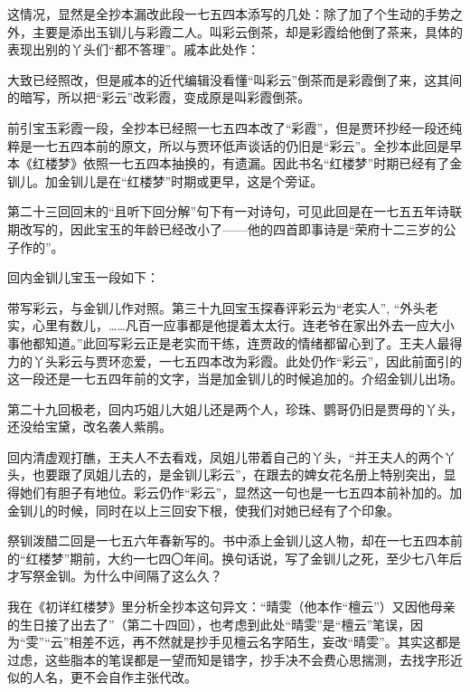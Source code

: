 \par 这情况，显然是全抄本漏改此段一七五四本添写的几处：除了加了个生动的手势之外，主要是添出玉钏儿与彩霞二人。叫彩云倒茶，却是彩霞给他倒了茶来，具体的表现出别的丫头们“都不答理”。戚本此处作：
\par 大致已经照改，但是戚本的近代编辑没看懂“叫彩云”倒茶而是彩霞倒了来，这其间的暗写，所以把“彩云”改彩霞，变成原是叫彩霞倒茶。
\par 前引宝玉彩霞一段，全抄本已经照一七五四本改了“彩霞”，但是贾环抄经一段还纯粹是一七五四本前的原文，所以与贾环低声谈话的仍旧是“彩云”。全抄本此回是早本《红楼梦》依照一七五四本抽换的，有遗漏。因此书名“红楼梦”时期已经有了金钏儿。加金钏儿是在“红楼梦”时期或更早，这是个旁证。
\par 第二十三回回末的“且听下回分解”句下有一对诗句，可见此回是在一七五五年诗联期改写的，因此宝玉的年龄已经改小了——他的四首即事诗是“荣府十二三岁的公子作的”。
\par 回内金钏儿宝玉一段如下：
\par 带写彩云，与金钏儿作对照。第三十九回宝玉探春评彩云为“老实人”, “外头老实，心里有数儿，……凡百一应事都是他提着太太行。连老爷在家出外去一应大小事他都知道。”此回写彩云正是老实而干练，连贾政的情绪都留心到了。王夫人最得力的丫头彩云与贾环恋爱，一七五四本改为彩霞。此处仍作“彩云”，因此前面引的这一段还是一七五四年前的文字，当是加金钏儿的时候追加的。介绍金钏儿出场。
\par 第二十九回极老，回内巧姐儿大姐儿还是两个人，珍珠、鹦哥仍旧是贾母的丫头，还没给宝黛，改名袭人紫鹃。
\par 回内清虚观打醮，王夫人不去看戏，凤姐儿带着自己的丫头，“并王夫人的两个丫头，也要跟了凤姐儿去的，是金钏儿彩云”，在跟去的婢女花名册上特别突出，显得她们有胆子有地位。彩云仍作“彩云”，显然这一句也是一七五四本前补加的。加金钏儿的时候，同时在以上三回安下根，使我们对她已经有了个印象。
\par 祭钏泼醋二回是一七五六年春新写的。书中添上金钏儿这人物，却在一七五四本前的“红楼梦”期前，大约一七四〇年间。换句话说，写了金钏儿之死，至少七八年后才写祭金钏。为什么中间隔了这么久？
\par 我在《初详红楼梦》里分析全抄本这句异文：“晴雯（他本作“檀云”）又因他母亲的生日接了出去了”（第二十四回），也考虑到此处“晴雯”是“檀云”笔误，因为“雯”“云”相差不远，再不然就是抄手见檀云名字陌生，妄改“晴雯”。其实这都是过虑，这些脂本的笔误都是一望而知是错字，抄手决不会费心思揣测，去找字形近似的人名，更不会自作主张代改。
